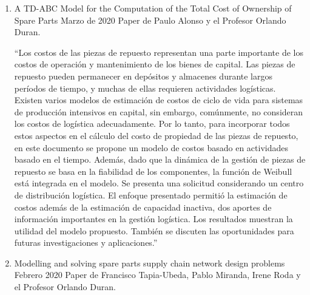 \documentclass[]{article}
\begin{document}
\begin{enumerate}
    \item 	A TD-ABC Model for the Computation of the Total Cost of Ownership of Spare Parts
Marzo de 2020 Paper de Paulo Alonso y el Profesor Orlando Duran.



“Los costos de las piezas de repuesto representan una parte importante de los costos de operación y mantenimiento de los bienes de capital. Las piezas de repuesto pueden permanecer en depósitos y almacenes durante largos períodos de tiempo, y muchas de ellas requieren actividades logísticas. Existen varios modelos de estimación de costos de ciclo de vida para sistemas de producción intensivos en capital, sin embargo, comúnmente, no consideran los costos de logística adecuadamente. Por lo tanto, para incorporar todos estos aspectos en el cálculo del costo de propiedad de las piezas de repuesto, en este documento se propone un modelo de costos basado en actividades basado en el tiempo. Además, dado que la dinámica de la gestión de piezas de repuesto se basa en la fiabilidad de los componentes, la función de Weibull está integrada en el modelo. Se presenta una solicitud considerando un centro de distribución logística. El enfoque presentado permitió la estimación de costos además de la estimación de capacidad inactiva, dos aportes de información importantes en la gestión logística. Los resultados muestran la utilidad del modelo propuesto. También se discuten las oportunidades para futuras investigaciones y aplicaciones.\cite{inbook}”



    \item 	Modelling and solving spare parts supply chain network design problems Febrero 2020
Paper de Francisco Tapia-Ubeda, Pablo Miranda, Irene Roda y el Profesor Orlando Duran.



\end{enumerate}
\end{document}
